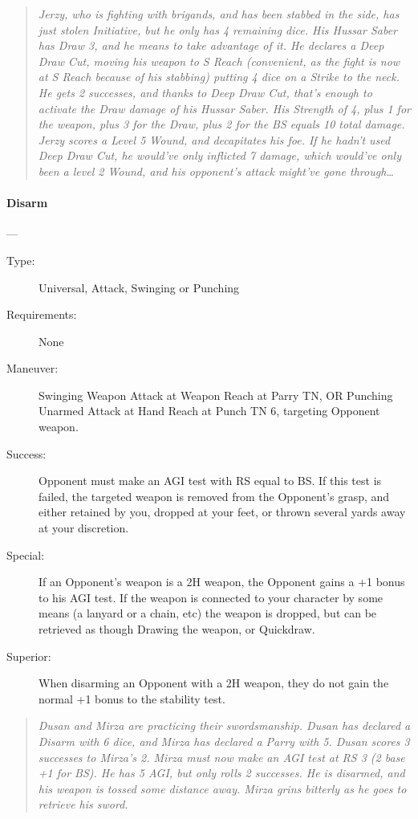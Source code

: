 \documentclass[oneside,11pt,english]{book}
\begin{document}
\begin{quotation}
  \emph{Jerzy, who is fighting with brigands, and has been stabbed in the side, has just stolen Initiative, but he only has 4 remaining dice. His Hussar Saber has Draw 3, and he means to take advantage of it. He declares a Deep Draw Cut, moving his weapon to S Reach (convenient, as the fight is now at S Reach because of his stabbing) putting 4 dice on a Strike to the neck. He gets 2 successes, and thanks to Deep Draw Cut, that’s enough to activate the Draw damage of his Hussar Saber. His Strength of 4, plus 1 for the weapon, plus 3 for the Draw, plus 2 for the BS equals 10 total damage. Jerzy scores a Level 5 Wound, and decapitates his foe. If he hadn’t used Deep Draw Cut, he would’ve only inflicted 7 damage, which would’ve only been a level 2 Wound, and his opponent’s attack might’ve gone through\ldots}
\end{quotation}

\paragraph{\large\label{man:Disarm}Disarm}---\quad{\large[X+1]}
\vspace{-10pt}\begin{description}
\item [Type:] Universal, Attack, Swinging or Punching 
\item [Requirements:] None 
\item [Maneuver:] Swinging Weapon Attack at Weapon Reach at Parry TN, OR Punching Unarmed Attack at Hand Reach at Punch TN 6, targeting Opponent weapon. 
\item [Success:] Opponent must make an AGI test with RS equal to BS. If this test is failed, the targeted weapon is removed from the Opponent's grasp, and either retained by you, dropped at your feet, or thrown several yards away at your discretion.
\item [Special:] If an Opponent’s weapon is a 2H weapon, the Opponent gains a +1 bonus to his AGI test.  If the weapon is connected to your character by some means (a lanyard or a chain, etc) the weapon is dropped, but can be retrieved as though Drawing the weapon, or Quickdraw. 
\item [Superior:] When disarming an Opponent with a 2H weapon, they do not gain the normal +1 bonus to the 
  stability test.
\end{description}
\begin{quotation}
  \emph{Dusan and Mirza are practicing their swordsmanship. Dusan has declared a Disarm with 6 dice, and Mirza has declared a Parry with 5. Dusan scores 3 successes to Mirza’s 2. Mirza must now make an AGI test at RS 3 (2 base +1 for BS). He has 5 AGI, but only rolls 2 successes. He is disarmed, and his weapon is tossed some distance away. Mirza grins bitterly as he goes to retrieve his sword.}
\end{quotation}
\end{document}
